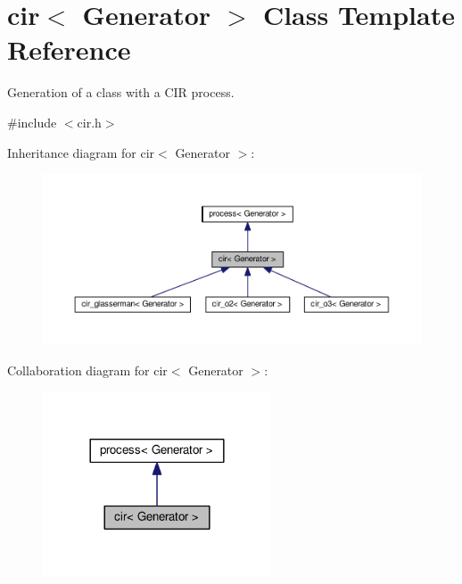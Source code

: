 \hypertarget{classcir}{}\section{cir$<$ Generator $>$ Class Template Reference}
\label{classcir}


Generation of a class with a C\+IR process.  




{\ttfamily \#include $<$cir.\+h$>$}



Inheritance diagram for cir$<$ Generator $>$\+:\nopagebreak
\begin{figure}[H]
\begin{center}
\leavevmode
\includegraphics[width=350pt]{classcir__inherit__graph}
\end{center}
\end{figure}


Collaboration diagram for cir$<$ Generator $>$\+:\nopagebreak
\begin{figure}[H]
\begin{center}
\leavevmode
\includegraphics[width=192pt]{classcir__coll__graph}
\end{center}
\end{figure}
